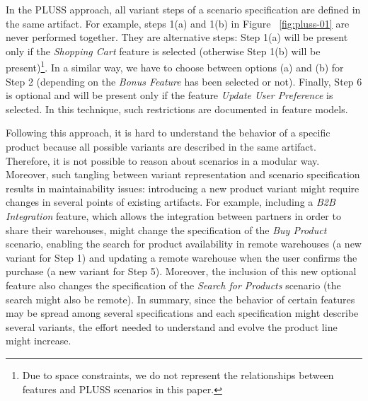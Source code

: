 \documentclass[11pt]{report}
\begin{document}

In the PLUSS approach, all variant steps of a scenario specification are defined
in the same artifact. For example, steps 1(a) and 1(b) in Figure
~\ref{fig:pluss-01} are never performed together. They are alternative steps:
Step 1(a) will be present only if the \emph{Shopping Cart} feature is selected
(otherwise Step 1(b) will be present)\footnote{Due to space constraints, we
do not represent the relationships between features and PLUSS scenarios in this
paper.}. In a similar way, we have to choose between options (a) and (b) for
Step 2 (depending on the \emph{Bonus Feature} has been selected or not). Finally, Step 6 is optional and will be present only if the feature \emph{Update User Preference} is selected. In this technique, such
restrictions are documented in feature models.

Following this approach, it is hard to understand the behavior of a specific
product because all possible variants are described in the same artifact.
Therefore, it is not possible to reason about scenarios in a modular way.
Moreover, such tangling between variant representation and scenario
specification results in maintainability issues: introducing a new product variant might require changes in several points of existing artifacts.  For example, including a
\emph{B2B Integration} feature, which allows the integration between partners in
order to share their warehouses, might change the specification of the \emph{Buy
Product} scenario, enabling the search for product availability in remote
warehouses (a new variant for Step 1) and updating a remote warehouse when the
user confirms the purchase (a new variant for Step 5). Moreover, the inclusion of
this new optional feature also changes the specification of the \emph{Search for
Products} scenario (the search might also be remote). In summary, since the
behavior of certain features may be spread among several specifications and each
specification might describe several variants, the effort needed to understand
and evolve the product line might increase.
\end{document}
